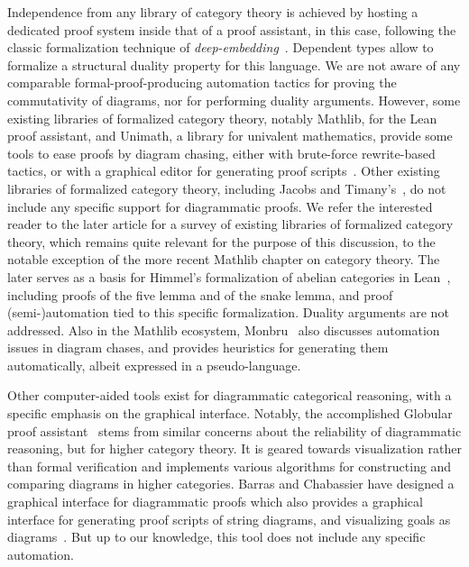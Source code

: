 \documentclass[a4paper,UKenglish,cleveref, autoref, thm-restate]{lipics-v2021}
\begin{document}
Independence from any library of category theory is achieved by hosting a dedicated proof system inside that of a proof assistant, \Coq in this case, following the classic formalization technique of \emph{deep-embedding}~\cite{DBLP:conf/tpcd/BoultonGGHHT92}. Dependent types allow to formalize a structural duality property for this language. We are not aware of any comparable formal-proof-producing automation tactics for proving the commutativity of diagrams, nor for performing duality arguments. However, some existing libraries of formalized category theory, notably \textsf{Mathlib}, for the \textsf{Lean} proof assistant, and \textsf{Unimath}, a \Coq{} library for univalent mathematics, provide some tools to ease proofs by diagram chasing, either with brute-force rewrite-based tactics, or with a graphical editor for generating proof scripts~\cite{lafont}. Other existing libraries of formalized category theory, including Jacobs and Timany's~\cite{DBLP:conf/rta/Timany016}, do not include any specific support for diagrammatic proofs. We refer the interested reader to the later article for a survey of existing libraries of formalized category theory, which remains quite relevant for the purpose of this discussion, to the notable exception of the more recent \textsf{Mathlib} chapter on category theory. The later serves as a basis for Himmel's formalization of abelian categories in \textsf{Lean}~\cite{himmel}, including proofs of the five lemma and of the snake lemma, and proof (semi-)automation tied to this specific formalization. Duality arguments are not addressed. Also in the \textsf{Mathlib} ecosystem, Monbru~\cite{monbru} also discusses automation issues in diagram chases, and provides heuristics for generating them automatically, albeit expressed in a pseudo-language.

Other computer-aided tools exist for diagrammatic categorical reasoning, with a specific emphasis on the graphical interface. Notably, the accomplished \textsf{Globular} proof assistant~\cite{DBLP:journals/lmcs/BarKV18} stems from similar concerns about the reliability of diagrammatic reasoning, but for higher category theory. It is  geared towards visualization rather than formal verification and implements various algorithms for constructing and comparing diagrams in higher categories. Barras and Chabassier have designed a graphical interface for diagrammatic proofs which also provides a graphical interface for generating \Coq{} proof scripts of string diagrams, and visualizing \Coq{} goals as diagrams~\cite{barras-chabassier}. But up to our knowledge, this tool does not include any specific automation.


\end{document}
